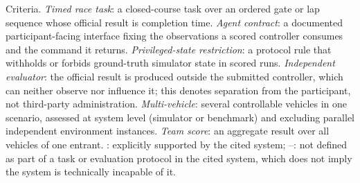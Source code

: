 \begin{table}[t]
\begin{tabular}{@{}llcccccc@{}}
\bottomrule
\end{tabular}

\mratablenote
Criteria. \emph{Timed race task}: a closed-course task over an ordered gate or
lap sequence whose official result is completion time. \emph{Agent contract}: a
documented participant-facing interface fixing the observations a scored
controller consumes and the command it returns. \emph{Privileged-state
restriction}: a protocol rule that withholds or forbids ground-truth simulator
state in scored runs. \emph{Independent evaluator}: the official result is
produced outside the submitted controller, which can neither observe nor
influence it; this denotes separation from the participant, not third-party
administration. \emph{Multi-vehicle}: several controllable vehicles in one
scenario, assessed at system level (simulator or benchmark) and excluding
parallel independent environment instances. \emph{Team score}: an aggregate
result over all vehicles of one entrant.
\checkmark: explicitly supported by the cited system; --: not defined as part of
a task or evaluation protocol in the cited system, which does not imply the
system is technically incapable of it.
\end{table}
